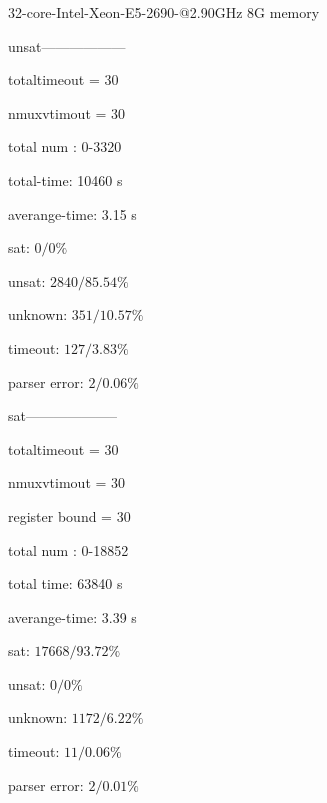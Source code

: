 32-core-Intel-Xeon-E5-2690-@2.90GHz
8G memory

unsat------------------

totaltimeout = 30

nmuxvtimout = 30

total num : 0-3320

total-time: 10460 s

averange-time: 3.15 s 

sat: $0 / 0\%$

unsat: $2840 / 85.54\%$

unknown: $351 / 10.57\%$

timeout: $127 / 3.83\%$

parser error: $2 / 0.06\%$

sat--------------------

totaltimeout = 30

nmuxvtimout = 30

register bound = 30

total num : 0-18852

total time: 63840 s

averange-time: 3.39 s 

sat: $17668 / 93.72\%$

unsat: $0 / 0\%$


unknown: $1172 / 6.22\%$

timeout: $11 / 0.06\%$

parser error: $2 / 0.01\%$